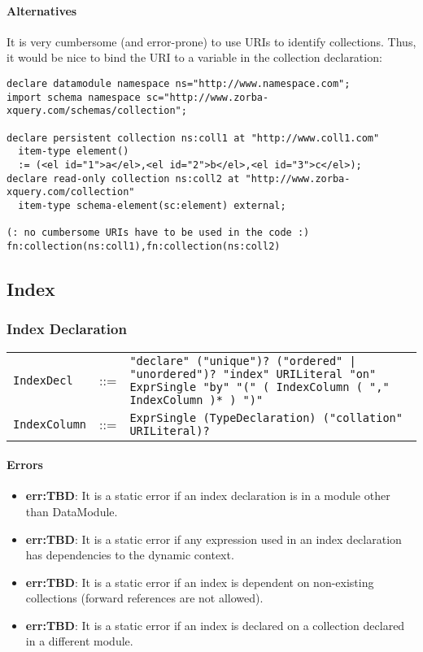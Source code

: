 \documentclass[]{article}
\begin{document}
\paragraph{Alternatives}
It is very cumbersome (and error-prone) to use URIs to identify collections. Thus, it would be nice to bind the URI to a variable in the collection declaration:
\begin{verbatim}
declare datamodule namespace ns="http://www.namespace.com";
import schema namespace sc="http://www.zorba-xquery.com/schemas/collection";

declare persistent collection ns:coll1 at "http://www.coll1.com" 
  item-type element() 
  := (<el id="1">a</el>,<el id="2">b</el>,<el id="3">c</el>);
declare read-only collection ns:coll2 at "http://www.zorba-xquery.com/collection" 
  item-type schema-element(sc:element) external;

(: no cumbersome URIs have to be used in the code :)
fn:collection(ns:coll1),fn:collection(ns:coll2)
\end{verbatim}

\subsection{Index}
\subsubsection{Index Declaration}
\begin{tabular}{l c p{12cm}}
{\tt IndexDecl}   & ::= & {\tt "declare" ("unique")? ("ordered" | "unordered")? "index" URILiteral "on" ExprSingle "by" "(" ( IndexColumn ( "," IndexColumn )* ) ")"} \\
{\tt IndexColumn} & ::= & {\tt ExprSingle (TypeDeclaration) ("collation" URILiteral)?}
\end{tabular}

\paragraph{Errors}
\begin{itemize}
  \item \textbf{err:TBD}: It is a static error if an index declaration is in a module other than DataModule.
  \item \textbf{err:TBD}: It is a static error if any expression used in an index declaration has dependencies to the dynamic context.
  \item \textbf{err:TBD}: It is a static error if an index is dependent on non-existing collections (forward references are not allowed).
  \item \textbf{err:TBD}: It is a static error if an index is declared on a collection declared in a different module.
\end{itemize}
\end{document}
